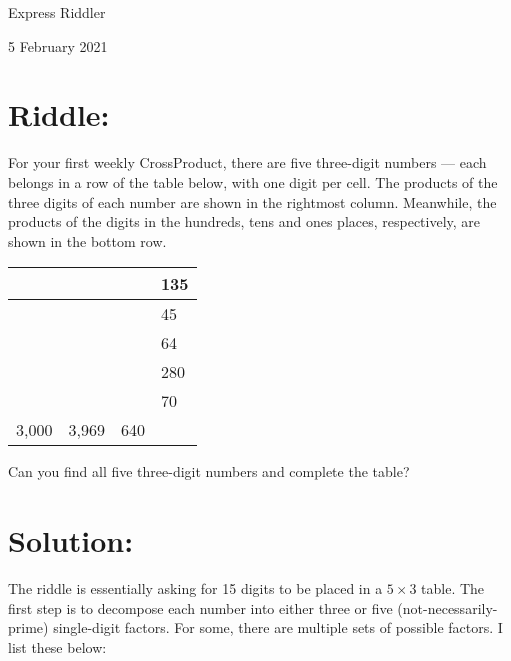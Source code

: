 \documentclass{article}
\begin{document}
\pagestyle{empty} %

\begin{center}
{\LARGE Express Riddler}

\vspace{0.15in}

{\Large 5 February 2021}
\end{center}


\section*{Riddle:}

For your first weekly CrossProduct, there are five three-digit numbers — each belongs in a row of the table below, with one digit per cell. The products of the three digits of each number are shown in the rightmost column. Meanwhile, the products of the digits in the hundreds, tens and ones places, respectively, are shown in the bottom row.

\begin{center}
\begin{tabular}{|C{0.75in}|C{0.75in}|C{0.75in}!{\vrule width 1.5pt}R{0.75in}|}
\hline
 & & & 135 \\
\hline
 & & & 45 \\
\hline
 & & & 64 \\
\hline
 & & & 280 \\
\hline
 & & & 70 \\
3,000 & 3,969 & 640 & \\
\hline
\end{tabular}
\end{center}

Can you find all five three-digit numbers and complete the table?

\section*{Solution:}

The riddle is essentially asking for 15 digits to be placed in a $5\times3$ table.
The first step is to decompose each number into either three or five (not-necessarily-prime) single-digit factors.
For some, there are multiple sets of possible factors.
I list these below:
\end{document}
